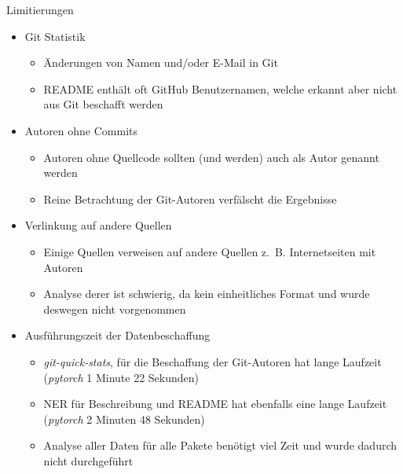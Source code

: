 \documentclass[%
    handout,
    aspectratio=1610,
    10pt,
    onlytextwidth, %
]{beamer}
\begin{document}
\begin{frame}{Limitierungen}
    \begin{itemize}
        \item Git Statistik
        \begin{itemize}
            \item Änderungen von Namen und/oder E-Mail in Git %
            \item README enthält oft GitHub Benutzernamen, welche erkannt aber nicht aus Git beschafft werden
        \end{itemize}
        \item Autoren ohne Commits
        \begin{itemize}
            \item Autoren ohne Quellcode sollten (und werden) auch als Autor genannt werden
            \item Reine Betrachtung der Git-Autoren verfälscht die Ergebnisse
        \end{itemize}
        \item Verlinkung auf andere Quellen
        \begin{itemize}
            \item Einige Quellen verweisen auf andere Quellen z.~B. Internetseiten mit Autoren
            \item Analyse derer ist schwierig, da kein einheitliches Format und wurde deswegen nicht vorgenommen
        \end{itemize}
        \item Ausführungszeit der Datenbeschaffung
        \begin{itemize}
            \item \emph{git-quick-stats}, für die Beschaffung der Git-Autoren hat lange Laufzeit (\emph{pytorch} 1 Minute 22 Sekunden)
            \item NER für Beschreibung und README hat ebenfalls eine lange Laufzeit (\emph{pytorch} 2 Minuten 48 Sekunden)
            \item Analyse aller Daten für alle Pakete benötigt viel Zeit und wurde dadurch nicht durchgeführt
        \end{itemize}
    \end{itemize}
\end{frame}
\end{document}
